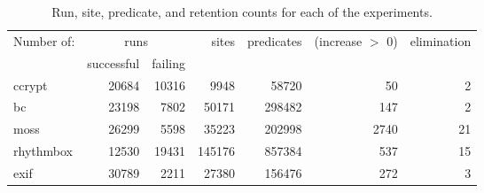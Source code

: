\begin{table*}
\begin{tabular}{|l|r|r|r|r|r|r|}
\hline
Number of: & \multicolumn{2}{c|}{runs} & sites  & predicates & (increase $>$ 0) & elimination \\
\cline{2-3}
           & successful & failing &  & & &  \\
\hline 
\hline 
ccrypt     & 20684 & 10316 & 9948   & 58720  & 50      & 2 \\
\hline 
bc         & 23198 & 7802  & 50171 & 298482 & 147 & 2 \\ 
\hline 
moss       & 26299 & 5598  & 35223  & 202998 & 2740    & 21 \\
\hline 
rhythmbox  & 12530 & 19431 & 145176 & 857384 & 537     & 15 \\
\hline 
exif       & 30789 & 2211  & 27380  & 156476 & 272     & 3 \\ 
\hline
\end{tabular}
\caption{Run, site, predicate, and retention counts for each of the experiments.}
\label{tab:exps}
\end{table*}

